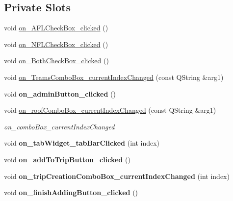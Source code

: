 \subsection*{Private Slots}
\begin{DoxyCompactItemize}
\item 
void \hyperlink{class_main_window_a009f72c029e675a368a4dd3aad2d52f6}{on\+\_\+\+A\+F\+L\+Check\+Box\+\_\+clicked} ()
\item 
void \hyperlink{class_main_window_ab17eb6df3cc6031458d0d0fe139f2de5}{on\+\_\+\+N\+F\+L\+Check\+Box\+\_\+clicked} ()
\item 
void \hyperlink{class_main_window_a042e8c2a44f0917066a389d93afd3c7a}{on\+\_\+\+Both\+Check\+Box\+\_\+clicked} ()
\item 
void \hyperlink{class_main_window_a6b44c6e98ed39eb1a633c93c60f34e6f}{on\+\_\+\+Teams\+Combo\+Box\+\_\+current\+Index\+Changed} (const Q\+String \&arg1)
\item 
\mbox{\label{class_main_window_ac447cca664d027a25bb0d132752718a0}} 
void {\bfseries on\+\_\+admin\+Button\+\_\+clicked} ()
\item 
void \hyperlink{class_main_window_aff2bf52ba8193c96f87e98359fe39041}{on\+\_\+roof\+Combo\+Box\+\_\+current\+Index\+Changed} (const Q\+String \&arg1)
\begin{DoxyCompactList}\small\item\em on\+\_\+combo\+Box\+\_\+current\+Index\+Changed \end{DoxyCompactList}\item 
\mbox{\label{class_main_window_a738c75b6db1208e2378a539403c6aff9}} 
void {\bfseries on\+\_\+tab\+Widget\+\_\+tab\+Bar\+Clicked} (int index)
\item 
\mbox{\label{class_main_window_ab3e92d8bc5acf84fb75615a5e379f90a}} 
void {\bfseries on\+\_\+add\+To\+Trip\+Button\+\_\+clicked} ()
\item 
\mbox{\label{class_main_window_afa7470de361f56ec45d9e8e5630fb46e}} 
void {\bfseries on\+\_\+trip\+Creation\+Combo\+Box\+\_\+current\+Index\+Changed} (int index)
\item 
\mbox{\label{class_main_window_a035f2eb137759b311f9cfe067ccc46d8}} 
void {\bfseries on\+\_\+finish\+Adding\+Button\+\_\+clicked} ()

\end{DoxyCompactItemize}
